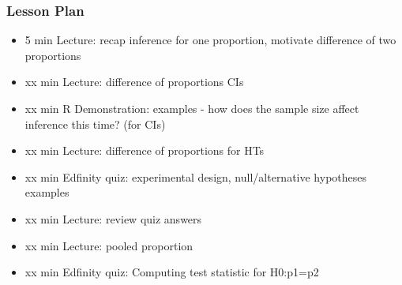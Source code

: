 \begin{frame}
    \frametitle{Lesson Plan}
    \begin{itemize}
        \item 5 min Lecture: recap inference for one proportion, motivate difference of two proportions
        \item xx min Lecture: difference of proportions CIs
        \item xx min R Demonstration: examples - how does the sample size affect inference this time? (for CIs)
        \item xx min Lecture: difference of proportions for HTs
        \item xx min Edfinity quiz: experimental design, null/alternative hypotheses examples
        \item xx min Lecture: review quiz answers
        \item xx min Lecture: pooled proportion
        \item xx min Edfinity quiz: Computing test statistic for H0:p1=p2
    \end{itemize}
\end{frame}
            

